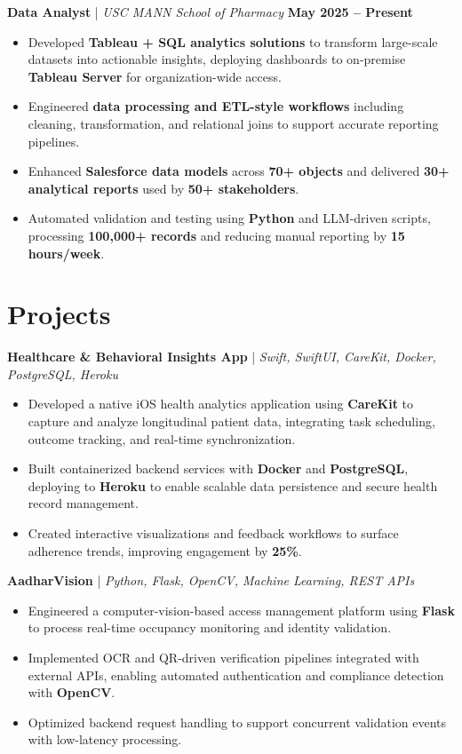 \documentclass[letterpaper,11pt]{article}
\begin{document}
\textbf{Data Analyst} \;|\; \textit{USC MANN School of Pharmacy} \hfill \textbf{May 2025 -- Present} \\

\begin{itemize}[noitemsep]
    \item Developed \textbf{Tableau + SQL analytics solutions} to transform large-scale datasets into actionable insights, deploying dashboards to on-premise \textbf{Tableau Server} for organization-wide access.
    \item Engineered \textbf{data processing and ETL-style workflows} including cleaning, transformation, and relational joins to support accurate reporting pipelines.
    \item Enhanced \textbf{Salesforce data models} across \textbf{70+ objects} and delivered \textbf{30+ analytical reports} used by \textbf{50+ stakeholders}.
    \item Automated validation and testing using \textbf{Python} and LLM-driven scripts, processing \textbf{100,000+ records} and reducing manual reporting by \textbf{15 hours/week}.
\end{itemize}



\section*{Projects}

\textbf{Healthcare \& Behavioral Insights App} \;|\; \textit{Swift, SwiftUI, CareKit, Docker, PostgreSQL, Heroku} \\
\begin{itemize}[noitemsep]
    \item Developed a native iOS health analytics application using \textbf{CareKit} to capture and analyze longitudinal patient data, integrating task scheduling, outcome tracking, and real-time synchronization.
    \item Built containerized backend services with \textbf{Docker} and \textbf{PostgreSQL}, deploying to \textbf{Heroku} to enable scalable data persistence and secure health record management.
    \item Created interactive visualizations and feedback workflows to surface adherence trends, improving engagement by \textbf{25\%}.
\end{itemize}

\textbf{AadharVision} \;|\; \textit{Python, Flask, OpenCV, Machine Learning, REST APIs} \\
\begin{itemize}[noitemsep]
    \item Engineered a computer-vision-based access management platform using \textbf{Flask} to process real-time occupancy monitoring and identity validation.
    \item Implemented OCR and QR-driven verification pipelines integrated with external APIs, enabling automated authentication and compliance detection with \textbf{OpenCV}.
    \item Optimized backend request handling to support concurrent validation events with low-latency processing.
\end{itemize}
\end{document}
